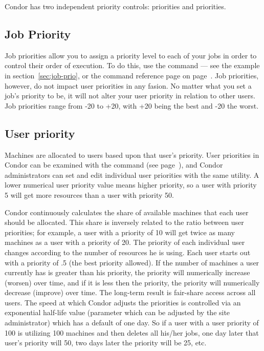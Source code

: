 Condor has two independent priority controls: 
priorities and  priorities.  

\subsection{Job Priority}

Job priorities allow you to assign a priority level to each of your jobs in order to
control their order of execution.  To do this, use the 
command --- see the example in section~\ref{sec:job-prio}, or the
command reference page on page~\pageref{man-condor-prio}.  Job
priorities, however, do not impact user priorities in any fasion.  No matter what you
set a job's priority to be, it will not alter your user priority in
relation to other users.  Job priorities range from -20 to +20, with +20
being the best and -20 the worst.  

\subsection{User priority}
\label{sec:user-priority-explained}

Machines are allocated to users based upon that user's priority. User
priorities in Condor can be examined with the 
command (see page~\pageref{man-condor-userprio}),
and Condor administrators can set and edit individual user priorities
with the same utility. A lower numerical user priority value means
higher priority, so a user with priority 5 will get more resources than
a user with priority 50.  

Condor continuously calculates the share of available machines that each
user should be allocated.    This share is inversely related to the ratio
between user priorities; for example, a user with a priority of 10 will
get twice as many machines as a user with a priority of 20. The priority
of each individual user changes according to the number of resources he
is using. Each user starts out with a priority of .5 (the best
priority allowed).  If the number of machines a user currently has is greater than his
priority, the priority will numerically increase (worsen) over time, and if it is less then
the priority, the priority will numerically decrease (improve) over time. 
The long-term result is fair-share access across all users.  The speed
at which Condor adjusts the priorities is controlled via an exponential
half-life value (parameter  which can be adjusted
by the site administrator) which has a
default of one day.  So if a user with a user priority of 100 is
utilizing 100 machines and then deletes all his/her jobs, one day later that user's
priority will  50, two days later the priority will be 25, etc. 

